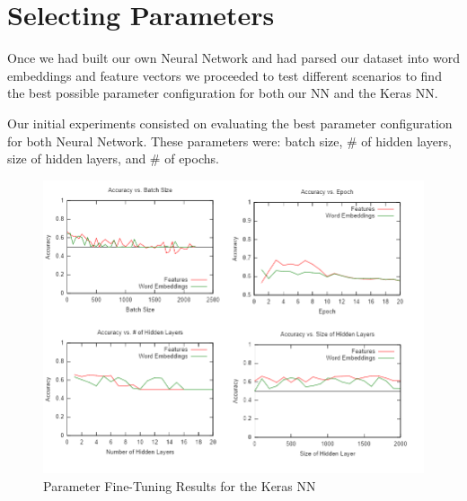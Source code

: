\documentclass[11pt,onecolumn]{article} %
\begin{document}
	
	
	
	\section{Selecting Parameters}
	Once we had built our own Neural Network and had parsed our dataset into word embeddings and feature vectors we proceeded to test different scenarios to find the best possible parameter configuration for both our NN and the Keras NN.
	\par Our initial experiments consisted on evaluating the best parameter configuration for both Neural Network. These parameters were: batch size, \# of hidden layers, size of hidden layers, and \# of epochs. 
	\begin{figure}[t]
		\centering
		\includegraphics[width=1.0\linewidth]{images/all_in_one}
		\caption{Parameter Fine-Tuning Results for the Keras NN}
		\label{fig:all_in_one}
	\end{figure}
	
\end{document}
